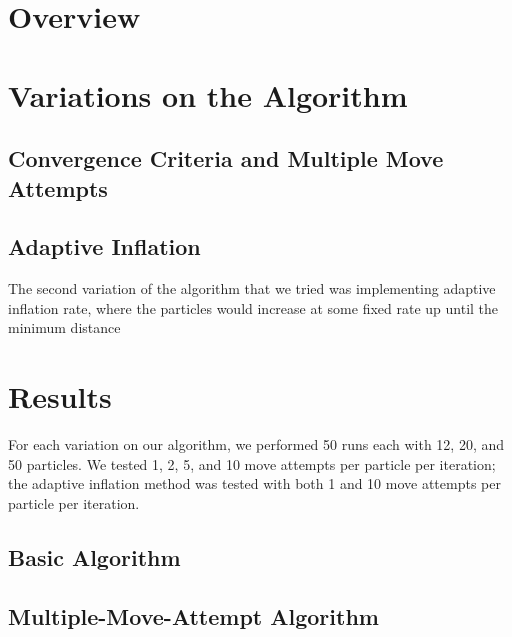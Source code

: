 \documentclass[twocolumn,10pt]{article}
\begin{document}

\section*{Overview}


\section*{Variations on the Algorithm}

\subsection*{Convergence Criteria and Multiple Move Attempts}




\subsection*{Adaptive Inflation}

The second variation of the algorithm that we tried was implementing adaptive
inflation rate, where the particles would increase at some fixed rate up until
the minimum distance 

\section*{Results}

For each variation on our algorithm, we performed 50 runs each with 12, 20,
and 50 particles. We tested 1, 2, 5, and 10 move attempts per particle per
iteration; the adaptive inflation method was tested with both 1 and 10 move
attempts per particle per iteration.

\subsection*{Basic Algorithm}



\subsection*{Multiple-Move-Attempt Algorithm}
\end{document}
